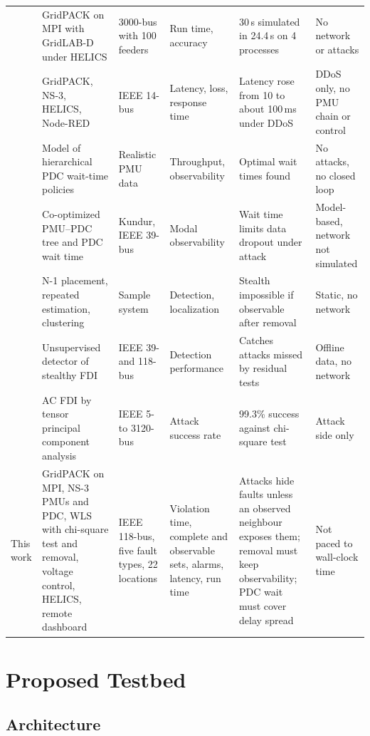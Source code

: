 \documentclass[journal]{IEEEtran}
\begin{document}
\begin{table}[t]
\begin{tabular}{@{}P{1.55cm}P{3.6cm}P{2.3cm}P{2.3cm}P{3.6cm}P{3.6cm}@{}}
\cite{zheng2024hpc} & GridPACK on MPI with GridLAB-D under HELICS & 3000-bus with 100 feeders & Run time, accuracy & 30\,s simulated in 24.4\,s on 4 processes & No network or attacks \\
\cite{islam2024remotely} & GridPACK, NS-3, HELICS, Node-RED & IEEE 14-bus & Latency, loss, response time & Latency rose from 10 to about 100\,ms under DDoS & DDoS only, no PMU chain or control \\
\cite{pourramezan2021pdc} & Model of hierarchical PDC wait-time policies & Realistic PMU data & Throughput, observability & Optimal wait times found & No attacks, no closed loop \\
\cite{zadsar2023preventing} & Co-optimized PMU--PDC tree and PDC wait time & Kundur, IEEE 39-bus & Modal observability & Wait time limits data dropout under attack & Model-based, network not simulated \\
\cite{khalafi2022intrusion} & N-1 placement, repeated estimation, clustering & Sample system & Detection, localization & Stealth impossible if observable after removal & Static, no network \\
\cite{chen2022datadriven} & Unsupervised detector of stealthy FDI & IEEE 39- and 118-bus & Detection performance & Catches attacks missed by residual tests & Offline data, no network \\
\cite{yang2024tensor} & AC FDI by tensor principal component analysis & IEEE 5- to 3120-bus & Attack success rate & 99.3\% success against chi-square test & Attack side only \\
\midrule
This work & GridPACK on MPI, NS-3 PMUs and PDC, WLS with chi-square test and removal, voltage control, HELICS, remote dashboard & IEEE 118-bus, five fault types, 22 locations & Violation time, complete and observable sets, alarms, latency, run time & Attacks hide faults unless an observed neighbour exposes them; removal must keep observability; PDC wait must cover delay spread & Not paced to wall-clock time \\
\bottomrule
\end{tabular}
\end{table}

\section{Proposed Testbed}
\label{sec:model}

\subsection{Architecture}
\end{document}

